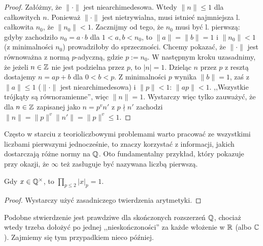 \begin{proof}
	Załóżmy, że $\|\cdot\|$ jest niearchimedesowa.
	Wtedy $\|n\| \le 1$ dla całkowitych $n$.
	Ponieważ $\|\cdot\|$ jest nietrywialna, musi istnieć najmniejsza l. całkowita $n_0$, że $\|n_0\| < 1$.
	Zacznijmy od tego, że $n_0$ musi być l. pierwszą: gdyby zachodziło $n_0 = a \cdot b$ dla $1 < a,b < n_0$, to $\|a\| = \|b\| = 1$ i $\|n_0\| < 1$ (z minimalności $n_0$) prowadziłoby do sprzeczności.
	Chcemy pokazać, że $\|\cdot\|$ jest równoważna z normą $p$-adyczną, gdzie $p := n_0$.
	W następnym kroku uzasadnimy, że jeżeli $n \in \mathbb Z$ nie jest podzielna przez $p$, to $|n| = 1$.
	Dzieląc $n$ przez $p$ z resztą dostajemy $n = ap + b$ dla $0 < b < p$.
	Z minimalności $p$ wynika $\|b\| = 1$, zaś z $\|a\| \le 1$ ($\|\cdot\|$ jest niearchimedesowa) i $\|p\| < 1$: $\|ap\| < 1$.
	,,Wszystkie trójkąty są równoramienne'', więc $\|n\| = 1$.
	Wystarczy więc tylko zauważyć, że dla $n \in \mathbb Z$ zapisanej jako $n = p^v n'$ z $p \nmid n'$ zachodzi $\|n\| = \|p\|^v \|n'\| = \|p\|^v \le 1$.
\end{proof}

\begin{historia}\end{historia}

Często w starciu z  teorioliczbowymi problemami warto pracować ze wszystkimi liczbami pierwszymi jednocześnie, to znaczy korzystać z informacji, jakich dostarczają różne normy na $\mathbb Q$.
Oto fundamentalny przykład, który pokazuje przy okazji, że $\infty$ też zasługuje być nazywana liczbą pierwszą.

\begin{fakt}[,,adelizm'' 1]
	Gdy $x \in \mathbb Q^\times$, to $\prod_{p \le 2} |x|_p = 1$.
\end{fakt}

\begin{proof}
	Wystarczy użyć zasadniczego twierdzenia arytmetyki.
\end{proof}

Podobne stwierdzenie jest prawdziwe dla skończonych rozszerzeń $\mathbb Q$, chociaż wtedy trzeba dołożyć po jednej ,,nieskończoności'' za każde włożenie w $\mathbb R$ (albo $\mathbb C$).
Zajmiemy się tym przypadkiem nieco później.
